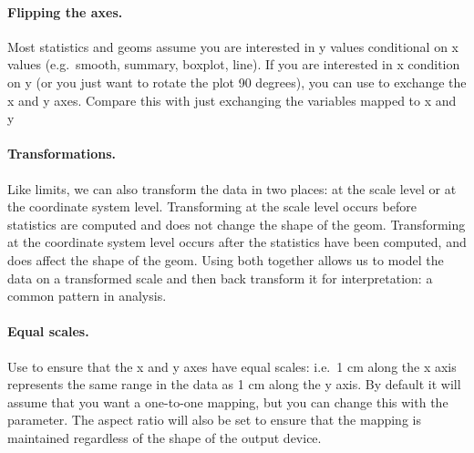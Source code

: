 \paragraph{Flipping the axes.}  Most statistics and geoms assume you are interested in y values conditional on x values (e.g.\ smooth, summary, boxplot, line).  If you are interested in x condition on y (or you just want to rotate the plot 90 degrees), you can use  to exchange the x and y axes.  Compare this with just exchanging the variables mapped to x and y

% 


\paragraph{Transformations.}  Like limits, we can also transform the data in two places: at the scale level or at the coordinate system level.  Transforming at the scale level occurs before statistics are computed and does not change the shape of the geom.  Transforming at the coordinate system level occurs after the statistics have been computed, and does affect the shape of the geom.  Using both together allows us to model the data on a transformed scale and then back transform it for interpretation: a common pattern in analysis.

% 


\paragraph{Equal scales.}  Use  to ensure that the x and y axes have equal scales: i.e.\ 1 cm along the x axis represents the same range in the data as 1 cm along the y axis.  By default it will assume that you want a one-to-one mapping, but you can change this with the  parameter.  The aspect ratio will also be set to ensure that the mapping is maintained regardless of the shape of the output device.

